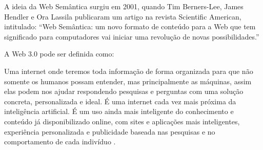A ideia da Web Semântica surgiu em 2001, quando Tim Berners-Lee, James Hendler e
Ora Lassila publicaram um artigo na revista Scientific American, intitulado: “Web
Semântica: um novo formato de conteúdo para a Web que tem significado para
computadores vai iniciar uma revolução de novas possibilidades.”

A Web 3.0 pode ser definida como:

\begin{citacao} 
 Uma internet onde teremos toda informação de forma organizada para que não
somente os humanos possam entender, mas principalmente as máquinas, assim elas
podem nos ajudar respondendo pesquisas e perguntas com uma solução concreta,
personalizada e ideal. É uma internet cada vez mais próxima da inteligência
artificial. É um uso ainda mais inteligente do conhecimento e conteúdo já
disponibilizado online, com sites e aplicações mais inteligentes, experiência
personalizada e publicidade baseada nas pesquisas e no comportamento de cada
indivíduo \cite{vicentim13}.
\end{citacao}
